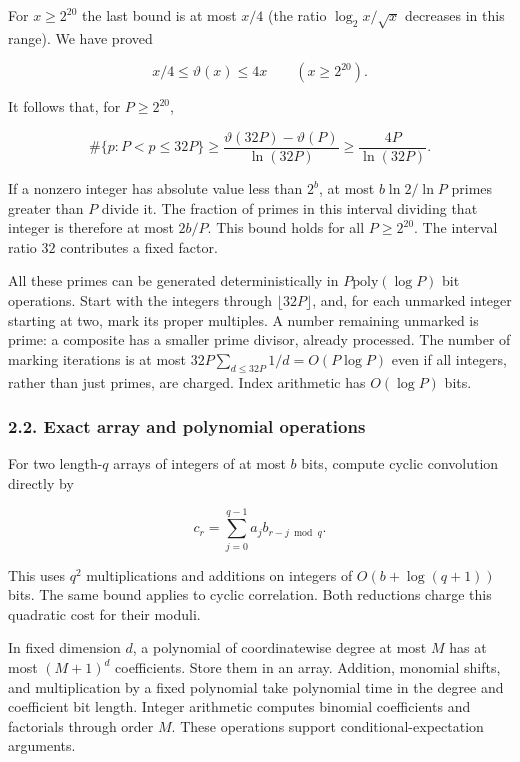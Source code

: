 For \(x\geq2^{20}\) the last bound is at most \(x/4\) (the ratio \(\log_2x/\sqrt x\) decreases in this range). We have proved

\[
x/4\leq\vartheta(x)\leq4x\qquad(x\geq2^{20}).
\]

It follows that, for \(P\geq2^{20}\),

\[
\#\{p:P<p\leq32P\}
\geq\frac{\vartheta(32P)-\vartheta(P)}{\ln(32P)}
\geq\frac{4P}{\ln(32P)}.
\]

If a nonzero integer has absolute value less than \(2^b\), at most \(b\ln2/\ln P\) primes greater than \(P\) divide it. The fraction of primes in this interval dividing that integer is therefore at most \(2b/P\). This bound holds for all \(P\geq2^{20}\). The interval ratio \(32\) contributes a fixed factor.

All these primes can be generated deterministically in \(P\mathrm{poly}(\log P)\) bit operations. Start with the integers through \(\lfloor32P\rfloor\), and, for each unmarked integer starting at two, mark its proper multiples. A number remaining unmarked is prime: a composite has a smaller prime divisor, already processed. The number of marking iterations is at most \(32P\sum_{d\leq32P}1/d=O(P\log P)\) even if all integers, rather than just primes, are charged. Index arithmetic has \(O(\log P)\) bits.

\hypertarget{af-a9ec399514-exact-array-and-polynomial-operations}{%
\subsubsection{2.2. Exact array and polynomial operations}\label{af-a9ec399514-exact-array-and-polynomial-operations}}

For two length-\(q\) arrays of integers of at most \(b\) bits, compute cyclic convolution directly by

\[
c_r=\sum_{j=0}^{q-1}a_j b_{r-j\bmod q}.
\]

This uses \(q^2\) multiplications and additions on integers of \(O(b+\log(q+1))\) bits. The same bound applies to cyclic correlation. Both reductions charge this quadratic cost for their moduli.

In fixed dimension \(d\), a polynomial of coordinatewise degree at most \(M\) has at most \((M+1)^d\) coefficients. Store them in an array. Addition, monomial shifts, and multiplication by a fixed polynomial take polynomial time in the degree and coefficient bit length. Integer arithmetic computes binomial coefficients and factorials through order \(M\). These operations support conditional-expectation arguments.

